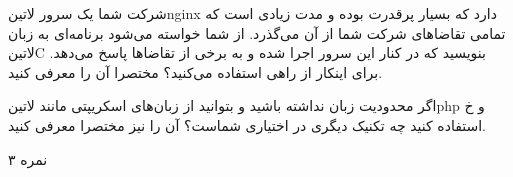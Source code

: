 \documentclass[../main.tex]{subfiles}
\begin{document}

شرکت شما یک سرور ‌لاتین{nginx} دارد که بسیار پرقدرت بوده و مدت زیادی است که تمامی تقاضاهای شرکت شما از آن می‌گذرد. از شما خواسته می‌شود برنامه‌ای به زبان ‌لاتین{C} بنویسید که در کنار این سرور اجرا شده و به برخی از تقاضاها پاسخ می‌دهد. برای اینکار از راهی استفاده می‌کنید؟ مختصرا آن را معرفی کنید.

اگر محدودیت زبان نداشته باشید و بتوانید از زبان‌های اسکریپتی مانند ‌لاتین{php} و ‌خ استفاده کنید چه تکنیک دیگری در اختیاری شماست؟ آن را نیز مختصرا معرفی کنید.

۳ نمره
\end{document}
